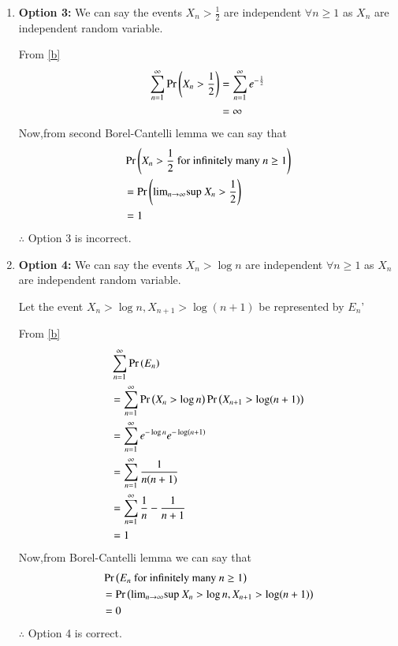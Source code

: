 \documentclass[journal,12pt,twocolumn]{IEEEtran}
\begin{document}
\begin{enumerate}
    \item \textbf{Option 3:} We can say the events $X_n>\frac{1}{2}$ are independent $\forall n\geq 1$ as $X_n$ are independent random variable.
    
    From \eqref{b}
    \begin{align}
        \sum_{n=1}^{\infty}\Pr\left(X_n > \frac{1}{2}\right) &= \sum_{n=1}^{\infty}e^{-\frac{1}{2}}\nonumber\\
                                            &= \infty\nonumber
    \end{align}
    Now,from second Borel-Cantelli lemma we can say that
    \begin{align}
        &\Pr\left(X_n>\frac{1}{2} \text{ for infinitely many }n\geq1\right)\nonumber\\
        &=\Pr\left(\text{lim}_{n \rightarrow \infty}\text{sup }X_n>\frac{1}{2}\right)\nonumber\\
        &=1\nonumber
    \end{align}
    $\therefore$ Option 3 is incorrect.
    \item \textbf{Option 4:} We can say the events $X_n>\log n$ are independent $\forall n\geq 1$ as $X_n$ are independent random variable.
    
    Let the event $X_n > \log n,X_{n+1}>\log (n+1)$ be represented by $E_n$'
    
    From \eqref{b}
    \begin{align}
        &\sum_{n=1}^{\infty}\Pr\left(E_n\right)\nonumber\\
        &= \sum_{n=1}^{\infty}\Pr\left(X_n>\log n\right)\Pr\left(X_{n+1}>\log (n+1)\right)\nonumber\\
        &=\sum_{n=1}^{\infty}e^{-\log n}e^{-\log (n+1)}\nonumber\\
        &=\sum_{n=1}^{\infty}\frac{1}{n(n+1)}\nonumber\\
        &=\sum_{n=1}^{\infty}\frac{1}{n}-\frac{1}{n+1}\nonumber\\
        &=1
    \end{align}
    Now,from Borel-Cantelli lemma we can say that
    \begin{align}
        &\Pr\left(E_n\text{ for infinitely many }n\geq1\right)\nonumber\\
        &=\Pr\left(\text{lim}_{n \rightarrow \infty}\text{sup }X_n>\log n,X_{n+1}>\log (n+1)\right)\nonumber\\
        &=0\nonumber
    \end{align}
    $\therefore$ Option 4 is correct.
\end{enumerate}
\vspace{0.5cm}\centering {}
\end{document}
